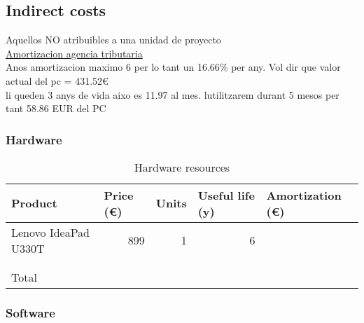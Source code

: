 \subsection{Indirect costs}
Aquellos NO atribuibles a una unidad de proyecto\\

\href{http://www.agenciatributaria.es/AEAT.internet/Inicio/_Segmentos_/Empresas_y_profesionales/Empresas/Impuesto_sobre_Sociedades/Periodos_impositivos_a_partir_de_1_1_2015/Base_imponible/Amortizacion/Tabla_de_coeficientes_de_amortizacion_lineal_.shtml}{Amortizacion agencia tributaria}\\
Anos amortizacion maximo 6 per lo tant un 16.66\% per any. Vol dir que valor actual del pc = 431.52€\\
li queden 3 anys de vida aixo es 11.97 al mes. lutilitzarem durant 5 mesos per tant 58.86 EUR del PC

\subsubsection{Hardware}

\begin{table}[h!]
	\centering
	\begin{tabular}{|l|r|r|r|r|}
		\hline
		Product              & \multicolumn{1}{l|}{Price (€)} & \multicolumn{1}{l|}{Units} & \multicolumn{1}{l|}{Useful life (y)} & \multicolumn{1}{l|}{Amortization (€)} \\ \hline
		Lenovo IdeaPad U330T & 899                            & 1                          & 6                                    &                                             \\ \hline
		&                                &                            &                                      &                                             \\ \hline
		&                                &                            &                                      &                                             \\ \hline\hline
		Total                                & \multicolumn{4}{r|}{}                                                                                           \\ \hline
	\end{tabular}
	\caption{Hardware resources}
	\label{Hardware resources}
\end{table}

\subsubsection{Software}

